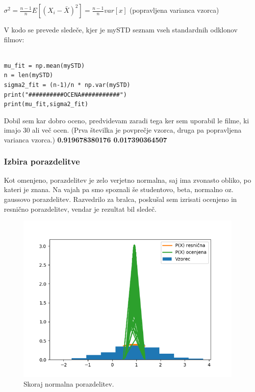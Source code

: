 \documentclass[a4paper,11pt]{article}
\begin{document}
$\sigma^2 = \frac{n-1}{n} E[(X_i-\bar{X})^2] = \frac{n-1}{n} var[x]$ (popravljena varianca vzorca)

V kodo se prevede sledeče, kjer je mySTD seznam vseh standardnih odklonov filmov:

\begin{lstlisting}[frame=single]  % Start your code-block

mu_fit = np.mean(mySTD)
n = len(mySTD)
sigma2_fit = (n-1)/n * np.var(mySTD)
print("##########OCENA###########")
print(mu_fit,sigma2_fit)
\end{lstlisting}
Dobil sem kar dobro oceno, predvidevam zaradi tega ker sem uporabil le filme, ki imajo 30 ali več ocen. (Prva številka je povprečje vzorca, druga pa popravljena varianca vzorca.)
\textbf{0.919678380176 0.017390364507}

\subsubsection{Izbira porazdelitve}
Kot omenjeno, porazdelitev je zelo verjetno normalna, saj ima zvonasto obliko, po kateri je znana. Na vajah pa smo spoznali še studentovo, beta, normalno oz. gaussovo porazdelitev. Razvedrilo za bralca, poskušal sem izrisati ocenjeno in resnično porazdelitev, vendar je rezultat bil sledeč.
\begin{figure}[htbp]
	\begin{center}
		\includegraphics[scale=0.6]{../slike/i_tried.png}
		\caption{Skoraj normalna porazdelitev.}
		\label{zanri_slika}
	\end{center}
\end{figure}
\pagebreak
\end{document}
